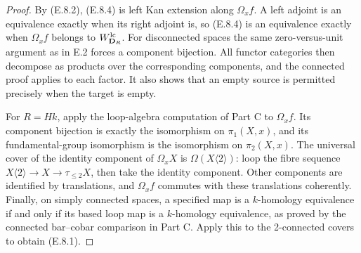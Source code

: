 \begin{proof}
By (E.8.2), (E.8.4) is left Kan extension along $\Omega_xf$.
A left adjoint is an equivalence exactly when its right
adjoint is, so (E.8.4) is an equivalence exactly when
$\Omega_xf$ belongs to $W_{\mathbf D_R}^{\mathrm{lc}}$.
For disconnected spaces the same zero-versus-unit argument
as in E.2 forces a component bijection.  All functor categories
then decompose as products over the corresponding components,
and the connected proof applies to each factor.  It also
shows that an empty source is permitted precisely when the
target is empty.

For $R=Hk$, apply the loop-algebra computation of Part C to
$\Omega_xf$.  Its component bijection is exactly the
isomorphism on $\pi_1(X,x)$, and its fundamental-group
isomorphism is the isomorphism on $\pi_2(X,x)$.
The universal cover of the identity component of
$\Omega_xX$ is $\Omega(X\langle2\rangle)$: loop the
fibre sequence $X\langle2\rangle\to X\to\tau_{\le2}X$,
then take the identity component.  Other components are
identified by translations, and $\Omega_xf$ commutes with
these translations coherently.  Finally, on simply connected
spaces, a specified map is a $k$-homology equivalence if and
only if its based loop map is a $k$-homology equivalence, as
proved by the connected bar--cobar comparison in Part C.
Apply this to the 2-connected covers to obtain (E.8.1).
\end{proof}


